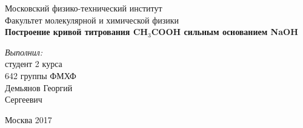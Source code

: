 \begin{titlepage}
\begin{center} 
 
\large Московский физико-технический институт\\
Факультет молекулярной и химической физики\\
\vspace{7cm}
\huge \textbf{Построение кривой титрования CH$_3$COOH сильным основанием NaOH}\\
\end{center} 

\vspace{7.5cm}
{\par \raggedleft \large \emph{Выполнил:}\\ студент 2 курса\\ 642 группы ФМХФ\\ Демьянов Георгий\\ Сергеевич \par}
\begin{center}
\vfill Москва 2017
\end{center}
\end{titlepage}
\newpage
\setcounter{page}{2}